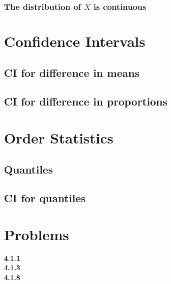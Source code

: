 \documentclass{book}
\theoremstyle{definition}
\begin{document}
\subsubsection{The distribution of $X$ is continuous}


\section{Confidence Intervals}
\subsection{CI for difference in means}
\subsection{CI for difference in proportions}


\section{Order Statistics}
\subsection{Quantiles}
\subsection{CI for quantiles}




\section{Problems}
\textbf{4.1.1}\\
\textbf{4.1.3}\\
\textbf{4.1.8}


	
	
\end{document}
